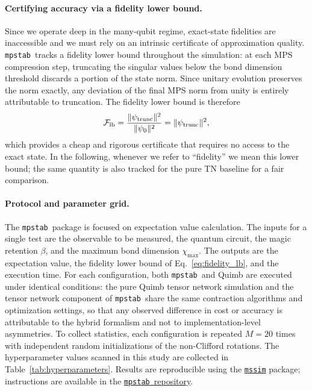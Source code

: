 \documentclass[pra,aps,twocolumn,longbibliography,preprintnumbers,superscriptaddress,nofootnotebib,10pt]{revtex4-2}
\newcommand{\mrr}{\beta}    %
\newcommand{\mpstab}{\texttt{mpstab}}
\begin{document}
\paragraph{Certifying accuracy via a fidelity lower bound.}
Since we operate deep in the many-qubit regime, exact-state fidelities are 
inaccessible and we must rely on an intrinsic certificate of approximation 
quality. \mpstab\ tracks a fidelity lower bound throughout the simulation: 
at each MPS compression step, truncating the singular values below the bond 
dimension threshold discards a portion of the state norm. Since unitary 
evolution preserves the norm exactly, any deviation of the final MPS norm 
from unity is entirely attributable to truncation. The fidelity lower bound 
is therefore
\begin{equation}
    \mathcal{F}_{\rm lb} = \frac{\|\psi_{\rm trunc}\|^2}{\|\psi_0\|^2} 
    = \|\psi_{\rm trunc}\|^2,
    \label{eq:fidelity_lb}
\end{equation}
which provides a cheap and rigorous certificate that requires no access to 
the exact state. In the following, whenever we refer to ``fidelity'' we mean 
this lower bound; the same quantity is also tracked for the pure TN baseline 
for a fair comparison. \\

\paragraph{Protocol and parameter grid.}
The \mpstab\ package is focused on expectation value calculation. The inputs 
for a single test are the observable to be measured, the quantum circuit, 
the magic retention $\mrr$, and the maximum bond dimension $\chi_{\max}$. 
The outputs are the expectation value, the fidelity lower bound of 
Eq.~\eqref{eq:fidelity_lb}, and the execution time. For each configuration, 
both \mpstab\ and Quimb are executed under identical conditions: 
the pure Quimb tensor network simulation and the tensor network component 
of \mpstab\ share the same contraction algorithms and optimization settings, 
so that any observed difference in cost or accuracy is attributable to the 
hybrid formalism and not to implementation-level asymmetries. To collect 
statistics, each configuration is repeated $M = 20$ times with independent 
random initializations of the non-Clifford rotations. The hyperparameter 
values scanned in this study are collected in 
Table~\ref{tab:hyperparameters}. Results are reproducible using the 
\href{https://github.com/mattia-robbiano/mssim}{\texttt{mssim}} package; 
instructions are available in the 
\href{https://github.com/MatteoRobbiati/mpstab/tree/main/reproduce_results}{\mpstab\ 
repository}.
\end{document}
